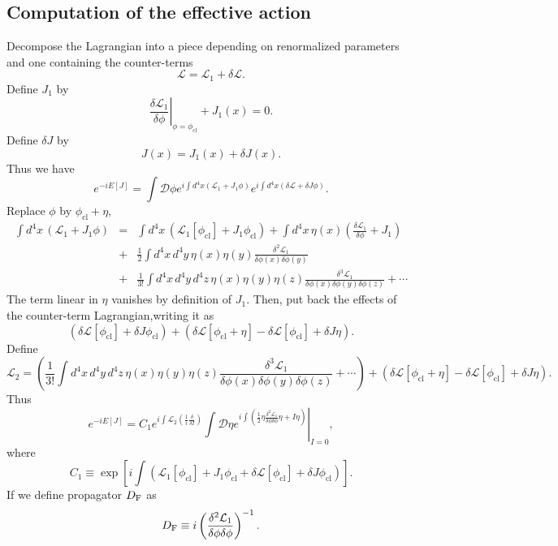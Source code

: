 \subsection{Computation of the effective action}
Decompose the Lagrangian into a piece depending on renormalized parameters and one containing the counter-terms
\[\mathcal{L} = \mathcal{L}_1 + \delta \mathcal{L}.\]
Define $J_1$ by
\[\left. \frac{\delta \mathcal{L}_1}{\delta \phi} \right|_{\phi = \phi_{\mathrm{cl}}} + J_1(x) = 0.\]
Define $\delta J$ by
\[J(x) = J_1(x) + \delta J(x).\]
Thus we have
\[e^{-iE[J]} = \int \mathcal{D}\phi e^{i\int d^4x (\mathcal{L}_1 + J_1\phi)} e^{i\int d^4x (\delta \mathcal{L} + \delta J \phi)}.\]
Replace $\phi$ by $\phi_{\mathrm{cl}}+\eta$,
\begin{eqnarray}
\int d^4x \, (\mathcal{L}_1 + J_1\phi) &=& \int d^4x \, (\mathcal{L}_1[\phi_{\mathrm{cl}}] + J_1\phi_{\mathrm{cl}}) + \int d^4x \, \eta(x) \left( \frac{\delta \mathcal{L}_1}{\delta \phi} + J_1 \right) \nonumber \\
&+& \frac{1}{2} \int d^4x \, d^4y \, \eta(x) \eta(y) \frac{\delta^2 \mathcal{L}_1}{\delta \phi(x) \delta \phi(y)} \nonumber \\
&+& \frac{1}{3!} \int d^4x \, d^4y \, d^4z \, \eta(x) \eta(y) \eta(z) \frac{\delta^3 \mathcal{L}_1}{\delta \phi(x) \delta \phi(y) \delta \phi(z)} + \cdots \nonumber
\end{eqnarray}
The term linear in $\eta$ vanishes by definition of $J_1$. 
Then, put back the effects of the counter-term Lagrangian,writing it as
\[(\delta \mathcal{L}[\phi_{\mathrm{cl}}] + \delta J \phi_{\mathrm{cl}} ) + ( \delta \mathcal{L}[\phi_{\mathrm{cl}} + \eta] - \delta\mathcal{L} [\phi_{\mathrm{cl}}] + \delta J \eta).\]
Define
\[\mathcal{L}_2 = \left(\frac{1}{3!} \int d^4x \, d^4y \, d^4z \, \eta(x) \eta(y) \eta(z) \frac{\delta^3 \mathcal{L}_1}{\delta \phi(x) \delta \phi(y) \delta \phi(z)} + \cdots \right) + ( \delta \mathcal{L}[\phi_{\mathrm{cl}} + \eta] - \delta\mathcal{L} [\phi_{\mathrm{cl}}] + \delta J \eta).\]
Thus
\[e^{-iE[J]} = C_1 e^{i\int \mathcal{L}_2(\frac{1}{i} \frac{\delta}{\delta I})} \left. \int \mathcal{D}\eta e^{i\int \left(\frac{1}{2} \eta \frac{\delta^2 \mathcal{L}_1}{\delta \phi \delta \phi} \eta + I\eta \right)} \right|_{I=0},\]
where
\[C_1 \equiv \exp \left[ i \int ( \mathcal{L}_1 [\phi_{\mathrm{cl}}] + J_1\phi_{\mathrm{cl}} + \delta \mathcal{L}[\phi_{\mathrm{cl}}] + \delta J \phi_{\mathrm{cl}} )\right].\]
If we define propagator $D_{\rm F}$ as
\[D_{\rm F} \equiv i \left( \frac{\delta^2 \mathcal{L}_1}{\delta \phi \delta \phi}\right)^{-1}.\]
